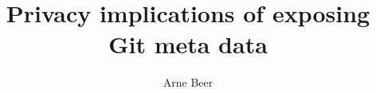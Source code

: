 \documentclass{thesis}
\title{Privacy implications of exposing Git meta data}
\author{Arne Beer}
\begin{document}

\cleardoublepage{}


\clearpage



{\small \tableofcontents}








\begingroup
    \footnotesize
    \listoffigures
    \let\clearpage\relax
    \listoftables
\endgroup

\renewcommand*{\bibfont}{\footnotesize}
\printbibliography{}
% 
% 



\end{document}
